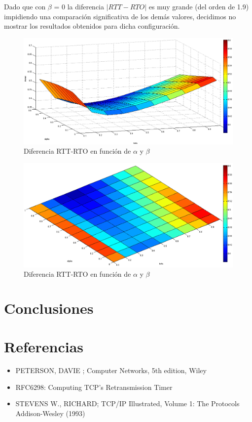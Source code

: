 \documentclass[10pt, a4paper]{article}
\begin{document}
Dado que con $\beta$ = 0 la diferencia $|RTT-RTO|$ es muy grande (del orden de 1.9) impidiendo una comparación significativa de los demás valores, decidimos no mostrar los resultados obtenidos para dicha configuración.

\begin{figure}[H]
\begin{center}
\includegraphics[width=17cm]{alphaBetaCorteCostado.png}
\caption{Diferencia RTT-RTO en función de $\alpha$ y $\beta$}
\end{center}
\end{figure}

\begin{figure}[H]
\begin{center}
\includegraphics[width=17cm]{alpha-beta-dif-SinCeroB.png}
\caption{Diferencia RTT-RTO en función de $\alpha$ y $\beta$}
\end{center}
\end{figure}

\section{Conclusiones}


\section{Referencias}
\begin{itemize}
\item PETERSON, DAVIE ; Computer Networks, 5th edition, Wiley

\item{RFC6298: Computing TCP's Retransmission Timer}

\item{STEVENS W., RICHARD; TCP/IP Illustrated, Volume 1: The Protocols Addison-Wesley (1993)}

\end{itemize}
\end{document}
